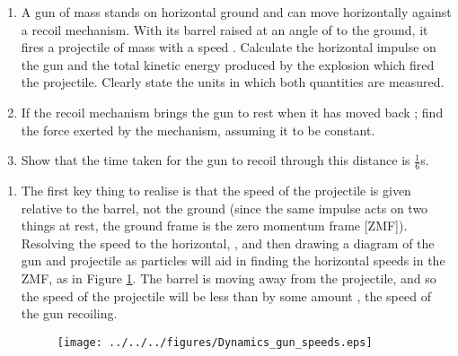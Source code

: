 
\begin{problem}[A1972AMIIQ2l] %
{\begin{enumerate}
	\item A gun of mass  stands on horizontal ground and can move horizontally against a recoil mechanism. With its barrel raised at an angle of  to the ground, it fires a projectile of mass  with a speed  . Calculate the horizontal impulse on the gun and the total kinetic energy produced by the explosion which fired the projectile. Clearly state the units in which both quantities are measured.
	\item If the recoil mechanism brings the gun to rest when it has moved back ; find the force exerted by the mechanism, assuming it to be constant.
	\item Show that the time taken for the gun to recoil through this distance is $\frac{1}{6}${s}.
\end{enumerate}
}
{}
{\begin{enumerate}
	\item The first key thing to realise is that the speed of the projectile is given relative to the barrel, not the ground (since the same impulse acts on two things at rest, the ground frame is the zero momentum frame [ZMF]). Resolving the speed to the horizontal, , and then drawing a diagram of the gun and projectile as particles will aid in finding the horizontal speeds in the ZMF, as in Figure \ref{fig:Dynamics_gun_speeds}. The barrel is moving away from the projectile, and so the speed of the projectile will be less than  by some amount , the speed of the gun recoiling.

\begin{figure}[h]
\centering
\texttt{[image: ../../../figures/Dynamics\_gun\_speeds.eps]}
\caption{}
\label{fig:Dynamics_gun_speeds}
\end{figure}


\end{enumerate}}
\end{problem}
